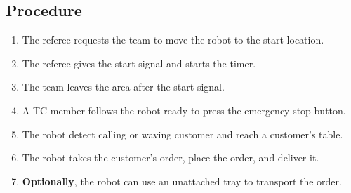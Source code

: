 \subsection*{Procedure}

\begin{enumerate}
	\item The referee requests the team to move the robot to the start location.
	\item The referee gives the start signal and starts the timer.
	\item The team leaves the area after the start signal.
	\item A TC member follows the robot ready to press the emergency stop button. 
	\item The robot detect calling or waving customer and reach a customer's table.
	\item The robot takes the customer's order, place the order, and deliver it.
	\item \textbf{Optionally}, the robot can use an unattached tray to transport the order.
\end{enumerate}


